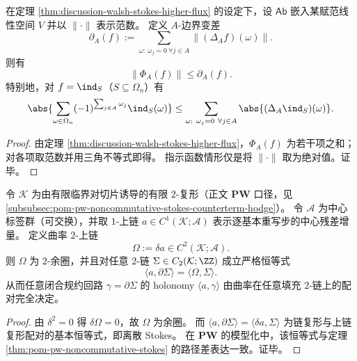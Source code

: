 \begin{corollary}\label{cor:discussion-walsh-bias-controlled-by-boundary-variation}
在定理 \ref{thm:discussion-walsh-stokes-higher-flux} 的设定下，设 \(\mathsf{Ab}\) 嵌入某赋范线性空间 \(V\) 并以 \(\|\cdot\|\) 表示范数。
定义 \(A\)-边界变差
\[
\partial_A(f):=\sum_{\omega:\ \omega_j=0\ \forall j\in A}\bigl\|(\Delta_A f)(\omega)\bigr\|.
\]
则有
\[
\bigl\|\Phi_A(f)\bigr\|\le \partial_A(f).
\]
特别地，对 \(f=\ind_S\)（\(S\subseteq\Omega_n\)）有
\[
\abs{\sum_{\omega\in\Omega_n}(-1)^{\sum_{j\in A}\omega_j}\ind_S(\omega)}
\le
\sum_{\omega:\ \omega_j=0\ \forall j\in A}\abs{(\Delta_A\ind_S)(\omega)}.
\]
\end{corollary}
\begin{proof}
由定理 \ref{thm:discussion-walsh-stokes-higher-flux}，\(\Phi_A(f)\) 为若干项之和；对各项取范数并用三角不等式即得。
指示函数情形仅是将 \(\|\cdot\|\) 取为绝对值。证毕。
\end{proof}

\begin{proposition}\label{prop:discussion-squier-curvature-holonomy-stokes}
令 \(\mathcal K\) 为由有限临界对切片诱导的有限 \(2\)-复形（正文 \(\mathbf{PW}\) 口径，见 \ref{subsubsec:pom-pw-noncommutative-stokes-counterterm-hodge}）。
令 \(\mathcal A\) 为中心标签群（可交换），并取 \(1\)-上链 \(a\in C^1(\mathcal K;\mathcal A)\) 表示逐基本重写步的中心残差增量。
定义曲率 \(2\)-上链
\[
\Omega:=\delta a\in C^2(\mathcal K;\mathcal A).
\]
则 \(\Omega\) 为 \(2\)-余圈，并且对任意 \(2\)-链 \(\Sigma\in C_2(\mathcal K;\ZZ)\) 成立严格恒等式
\[
\boxed{\;\langle a,\partial\Sigma\rangle=\langle \Omega,\Sigma\rangle.\;}
\]
从而任意闭合规约回路 \(\gamma=\partial\Sigma\) 的 holonomy \(\langle a,\gamma\rangle\) 由曲率在任意填充 \(2\)-链上的配对完全决定。
\end{proposition}
\begin{proof}
由 \(\delta^2=0\) 得 \(\delta\Omega=0\)，故 \(\Omega\) 为余圈。
而 \(\langle a,\partial\Sigma\rangle=\langle \delta a,\Sigma\rangle\) 为链复形与上链复形配对的基本恒等式，即离散 Stokes。
在 \(\mathbf{PW}\) 的模型化中，该恒等式与定理 \ref{thm:pom-pw-noncommutative-stokes} 的路径差表达一致。证毕。
\end{proof}

